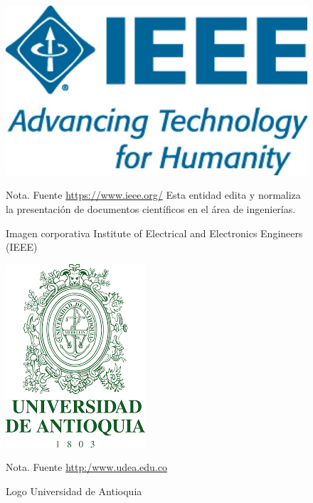 \begin{figure}[!ht]
    \begin{center}
    \includegraphics[scale=0.5]{imagenes/ieee_logo.jpg}\\
    \end{center}
    \caption{Imagen corporativa Institute of Electrical and Electronics Engineers (IEEE)}
    \label{figportada_apa}
    \footnotesize{Nota. Fuente \url{https://www.ieee.org/} Esta entidad edita y normaliza la presentación de documentos científicos en el área de ingenierías.} %
\end{figure}

\clearpage

\begin{figure}[!ht]
    \begin{center}
    \includegraphics{imagenes/escudo_udea_solo.png}\\
    \end{center}
    \caption{Logo Universidad de Antioquia}
    \label{fig:escudo_udea}
    \footnotesize{Nota. Fuente \url{http:/www.udea.edu.co}}
\end{figure}

\clearpage

